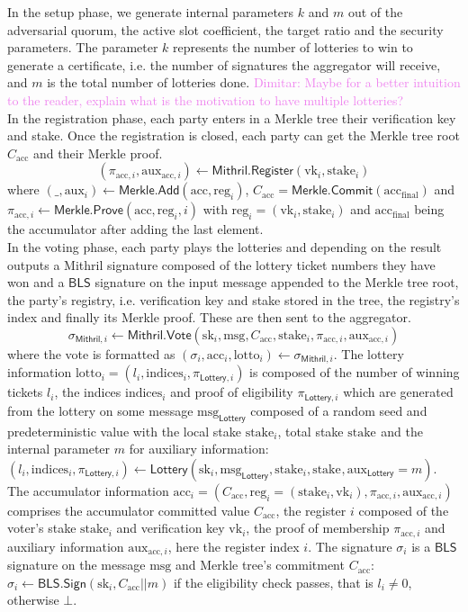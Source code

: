 \documentclass{article}
\newcommand{\vk}[1]{\ensuremath{\textrm{vk}_{#1}}\xspace}
\newcommand{\sk}[1]{\ensuremath{\textrm{sk}_{#1}}\xspace}
\newcommand{\m}{\ensuremath{\textrm{msg}}\xspace}
\newcommand{\acc}{\ensuremath{\textrm{acc}}\xspace}
\newcommand{\aux}{\ensuremath{\textrm{aux}}\xspace}
\newcommand{\reg}[1]{\ensuremath{\textrm{reg}_{#1}}\xspace}
\newcommand{\stake}[1]{\ensuremath{\textrm{stake}_{#1}}\xspace}
\newcommand{\lotto}[1]{\ensuremath{\textrm{lotto}_{#1}}\xspace}
\newcommand{\indices}[1]{\ensuremath{\textrm{indices}_{#1}}\xspace}
\newcommand{\BLS}{\ensuremath{\mathsf{BLS}}\xspace}
\newcommand{\Merkle}{\ensuremath{\mathsf{Merkle}}\xspace}
\newcommand{\Mithril}{\ensuremath{\mathsf{Mithril}}\xspace}
\newcommand{\Lottery}{\ensuremath{\mathsf{Lottery}}\xspace}
\newcommand{\Vote}{\ensuremath{\mathsf{Vote}}\xspace}
\newcommand{\Sign}{\ensuremath{\mathsf{Sign}}\xspace}
\newcommand{\Add}{\ensuremath{\mathsf{Add}}\xspace}
\newcommand{\Prove}{\ensuremath{\mathsf{Prove}}\xspace}
\newcommand{\Commit}{\ensuremath{\mathsf{Commit}}\xspace}
\newcommand{\Register}{\ensuremath{\mathsf{Register}}\xspace}
\newcommand{\dimitar}[1]{\textcolor{violet}{Dimitar: #1}\xspace}
\begin{document}
In the setup phase, we generate internal parameters $k$ and $m$ out of the adversarial quorum, the active slot coefficient, the target ratio and the security parameters. The parameter $k$ represents the number of lotteries to win to generate a certificate, i.e. the number of signatures the aggregator will receive, and $m$ is the total number of lotteries done. \dimitar{Maybe for a better intuition to the reader, explain what is the motivation to have multiple lotteries?}\\

In the registration phase, each party enters in a Merkle tree their verification key and stake. Once the registration is closed, each party can get the Merkle tree root $C_\acc$ and their Merkle proof.
$$ (\pi_{\acc, i}, \aux_{\acc, i}) \leftarrow \Mithril.\Register(\vk{i}, \stake{i}) $$
where $(\_, \aux_i) \leftarrow \Merkle.\Add(\acc, \reg{i})$, $C_\acc = \Merkle.\Commit(\acc_\text{final})$ and $\pi_{\acc, i} \leftarrow \Merkle.\Prove(\acc, \reg{i}, i)$ with $\reg{i} =(\vk{i}, \stake{i})$ and $\acc_\text{final}$ being the accumulator after adding the last element.\\


In the voting phase, each party plays the lotteries and depending on the result outputs a Mithril signature composed of the lottery ticket numbers they have won and a \BLS signature on the input message appended to the Merkle tree root, the party's registry, i.e. verification key and stake stored in the tree, the registry's index and finally its Merkle proof. These are then sent to the aggregator.
$$
\sigma_{\Mithril, i} \leftarrow \Mithril.\Vote(\sk{i}, \m, C_\acc, \stake{i}, \pi_{\acc, i}, \aux_{\acc, i})
$$
where the vote is formatted as $(\sigma_i, \acc_i, \lotto{i}) \leftarrow \sigma_{\Mithril, i}$.
%
The lottery information $\lotto{i} = (l_i, \indices{i}, \pi_{\Lottery, i})$ is composed of the number of winning tickets $l_i$, the indices $\indices{i}$ and proof of eligibility $\pi_{\Lottery, i}$ which are generated from the lottery on some message $\m_\Lottery$ composed of a random seed and predeterministic value with the local stake \stake{i}, total stake \stake{} and the internal parameter $m$ for auxiliary information: $(l_i, \indices{i}, \pi_{\Lottery,i})\leftarrow \Lottery(\sk{i}, \m_\Lottery, \stake{i}, \stake{}, \aux_\Lottery = m)$.
%
The accumulator information $\acc_i = (C_\acc, \reg{i} = (\stake{i}, \vk{i}), \pi_{\acc, i}, \aux_{\acc, i})$ comprises the accumulator committed value $C_\acc$, the register $i$ composed of the voter's stake \stake{i} and verification key \vk{i}, the proof of membership $\pi_{\acc, i}$ and auxiliary information $\aux_{\acc, i}$, here the register index $i$.
%
The signature $\sigma_i$ is a \BLS signature on the message $\m$ and Merkle tree's commitment $C_\acc$: $\sigma_i \leftarrow \BLS.\Sign(\sk{i}, C_\acc || m)$ if the eligibility check passes, that is $l_i \neq 0$, otherwise $\bot$.
\end{document}
